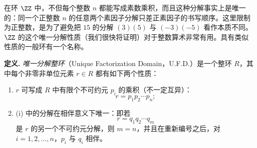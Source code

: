 在环 $\ZZ$ 中，不但每个整数 $n$ 都能写成素数乘积，而且这种分解事实上是唯一的：同一个正整数 $n$ 的任意两个素因子分解只差正素因子的书写顺序。这里限制为正整数，是为了避免把 $15$ 的分解 $(3)(5)$ 与 $(-3)(-5)$ 看作本质不同。$\ZZ$ 的这个唯一分解性质（我们很快将证明）对于整数算术非常有用。具有类似性质的一般环有一个名称。

\medskip
\noindent\textbf{定义.}
\emph{唯一分解整环}（Unique Factorization Domain，U.F.D.）是一个整环 $R$，其中每个非零非单位元素 $r\in R$ 都有如下两个性质：
\begin{enumerate}[label=(\roman*)]
	\item $r$ 可写成 $R$ 中有限个不可约元 $p_i$ 的乘积（不一定互异）：
	\[
	r=p_1p_2\cdots p_n;
	\]
	\item (i) 中的分解在相伴意义下唯一：即若
	\[
	r=q_1q_2\cdots q_m
	\]
	是 $r$ 的另一个不可约元分解，则 $m=n$，并且在重新编号之后，对 $i=1,2,\ldots,n$，$p_i$ 与 $q_i$ 相伴。
\end{enumerate}

